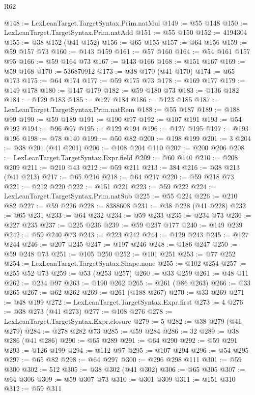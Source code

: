 \begin{lexlean}{R62}
\begin{coremodule}
@148 := LexLeanTarget.TargetSyntax.Prim.natMul
@149 := @55 @148
@150 := LexLeanTarget.TargetSyntax.Prim.natAdd
@151 := @55 @150
@152 := 4194304
@155 := @38 @152 (@41 @152)
@156 := @65 @155
@157 := @64 @156
@159 := @59 @157 @73
@160 := @143 @159
@161 := @57 @160
@164 := @54 @161 @157 @95
@166 := @59 @164 @73
@167 := @143 @166
@168 := @151 @167
@169 := @59 @168
@170 := 536870912
@173 := @38 @170 (@41 @170)
@174 := @65 @173
@175 := @64 @174
@177 := @59 @175 @73
@178 := @169 @177
@179 := @149 @178
@180 := @147 @179
@182 := @59 @180 @73
@183 := @136 @182
@184 := @129 @183
@185 := @127 @184
@186 := @123 @185
@187 := LexLeanTarget.TargetSyntax.Prim.natRem
@188 := @55 @187
@189 := @188 @99
@190 := @59 @189
@191 := @190 @97
@192 := @107 @191
@193 := @54 @192
@194 := @96 @97
@195 := @129 @194
@196 := @127 @195
@197 := @193 @196
@198 := @78 @140
@199 := @50 @82
@200 := @198 @199
@201 := 3
@204 := @38 @201 (@41 @201)
@206 := @108 @204 @110
@207 := @200 @206
@208 := LexLeanTarget.TargetSyntax.Expr.field
@209 := @60 @140
@210 := @208 @209
@211 := @210 @43
@212 := @59 @211
@213 := 384
@216 := @38 @213 (@41 @213)
@217 := @65 @216
@218 := @64 @217
@220 := @59 @218 @73
@221 := @212 @220
@222 := @151 @221
@223 := @59 @222
@224 := LexLeanTarget.TargetSyntax.Prim.natSub
@225 := @55 @224
@226 := @210 @82
@227 := @59 @226
@228 := 8388608
@231 := @38 @228 (@41 @228)
@232 := @65 @231
@233 := @64 @232
@234 := @59 @233
@235 := @234 @73
@236 := @227 @235
@237 := @225 @236
@239 := @59 @237 @177
@240 := @149 @239
@242 := @59 @240 @73
@243 := @223 @242
@244 := @129 @243
@245 := @127 @244
@246 := @207 @245
@247 := @197 @246
@248 := @186 @247
@250 := @59 @248 @73
@251 := @105 @250
@252 := @101 @251
@253 := @77 @252
@254 := LexLeanTarget.TargetSyntax.Shape.none
@255 := @102 @254
@257 := @255 @52 @73
@259 := @53 (@253 @257)
@260 := @33 @259
@261 := @48 @11
@262 := @234 @97
@263 := @190 @262
@265 := @261 (@86 @263)
@266 := @33 @265
@267 := @62 @262
@269 := @261 (@188 @267)
@270 := @33 @269
@271 := @48 @199
@272 := LexLeanTarget.TargetSyntax.Expr.first
@273 := 4
@276 := @38 @273 (@41 @273)
@277 := @108 @276
@278 := LexLeanTarget.TargetSyntax.Expr.closure
@279 := 5
@282 := @38 @279 (@41 @279)
@284 := @278 @282 @73
@285 := @59 @284
@286 := 32
@289 := @38 @286 (@41 @286)
@290 := @65 @289
@291 := @64 @290
@292 := @59 @291
@293 := @126 @199
@294 := @112 @97
@295 := @107 @294
@296 := @54 @295
@297 := @65 @82
@298 := @64 @297
@300 := @296 @298 @111
@301 := @59 @300
@302 := 512
@305 := @38 @302 (@41 @302)
@306 := @65 @305
@307 := @64 @306
@309 := @59 @307 @73
@310 := @301 @309
@311 := @151 @310
@312 := @59 @311

\end{coremodule}
\end{lexlean}
